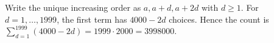 Write the unique increasing order as $ a,a+d,a+2d $ with $ d\ge1 $. For $ d=1,\ldots,1999 $, the first term has $ 4000-2d $ choices. Hence the count is $\sum_{d=1}^{1999}(4000-2d)=1999\cdot2000=\boxed{3998000}$.
